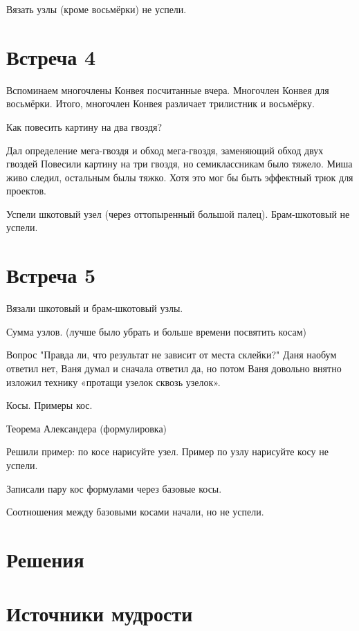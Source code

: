\documentclass[12pt]{article}
\newcounter{problem}[section]
\theoremstyle{definition}
\begin{document}
Вязать узлы (кроме восьмёрки) не успели.

\section{Встреча 4}

Вспоминаем многочлены Конвея посчитанные вчера.
Многочлен Конвея для восьмёрки. Итого, многочлен Конвея различает
трилистник и восьмёрку.

Как повесить картину на два гвоздя?

Дал определение мега-гвоздя и обход мега-гвоздя, заменяющий обход двух гвоздей
Повесили картину на три гвоздя, но семиклассникам было тяжело. Миша живо следил,
остальным былы тяжко.
Хотя это мог бы быть эффектный трюк для проектов.

Успели шкотовый узел (через оттопыренный большой палец).
Брам-шкотовый не успели.

\section{Встреча 5}

Вязали шкотовый и брам-шкотовый узлы.

Сумма узлов. (лучше было убрать и больше времени посвятить косам)

Вопрос "Правда ли, что результат не зависит от места склейки?"
Даня наобум ответил нет, Ваня думал и сначала ответил да, но потом
Ваня довольно внятно изложил технику «протащи узелок сквозь узелок».

Косы. Примеры кос.

Теорема Александера (формулировка)

Решили пример: по косе нарисуйте узел. Пример по узлу нарисуйте косу не успели.

Записали пару кос формулами через базовые косы.

Соотношения между базовыми косами начали, но не успели.



\renewenvironment{solution}[1]{%
         \vskip .5cm plus 2cm minus 0.1cm%
         {\bfseries \hyperlink{problem:#1}{#1.}}%
}%
{%
}%

\section{Решения}



\section{Источники мудрости}
\printbibliography[heading=none]
\end{document}
